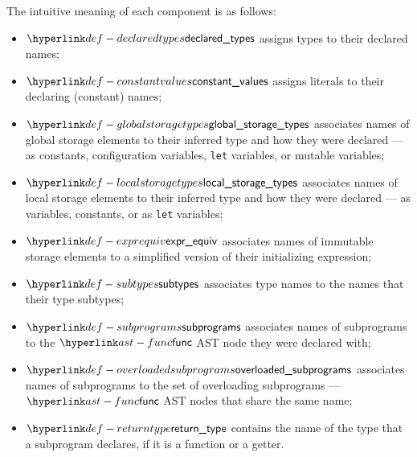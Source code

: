 The intuitive meaning of each component is as follows:
\begin{itemize}
  \hypertarget{def-declaredtypes}{}
  \item $\declaredtypes$ assigns types to their declared names;
  \hypertarget{def-constantvalues}{}
  \item $\constantvalues$ assigns literals to their declaring (constant) names;
  \hypertarget{def-globalstoragetypes}{}
  \item $\globalstoragetypes$ associates names of global storage elements to their inferred type
  and how they were declared --- as constants, configuration variables, \texttt{let} variables,
  or mutable variables;
  \hypertarget{def-localstoragetypes}{}
  \item $\localstoragetypes$ associates names of local storage elements to their inferred type
  and how they were declared --- as variables, constants, or as \texttt{let} variables;
  \hypertarget{def-exprequiv}{}
  \item $\exprequiv$ associates names of immutable storage elements to a simplified version
  of their initializing expression;
  \hypertarget{def-subtypes}{}
  \item $\subtypes$ associates type names to the names that their type subtypes;
  \hypertarget{def-subprograms}{}
  \item $\subprograms$ associates names of subprograms to the $\func$ AST node they were
  declared with;
  \hypertarget{def-overloadedsubprograms}{}
  \item $\overloadedsubprograms$ associates names of subprograms to the set of overloading
  subprograms ---  $\func$ AST nodes that share the same name;
  \hypertarget{def-returntype}{}
  \item $\returntype$ contains the name of the type that a subprogram declares, if it is
  a function or a getter.
\end{itemize}

